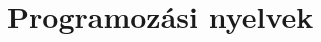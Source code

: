 \documentclass[11pt,a4paper]{article}
\theoremstyle{plain}
\begin{document}
\section{Programozási nyelvek}
\label{sec:proglang}


\newpage
\printbibliography
\end{document}
